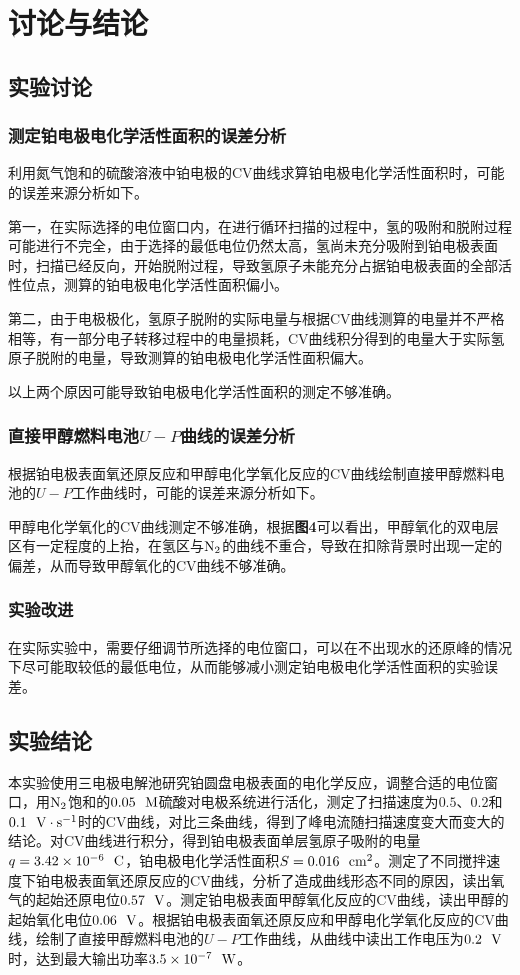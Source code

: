 \documentclass[12pt]{article}
\begin{document}
 	 \section{讨论与结论}
		\subsection{实验讨论}
 			\subsubsection{测定铂电极电化学活性面积的误差分析}
利用氮气饱和的硫酸溶液中铂电极的CV曲线求算铂电极电化学活性面积时，可能的误差来源分析如下。\par 
第一，在实际选择的电位窗口内，在进行循环扫描的过程中，氢的吸附和脱附过程可能进行不完全，由于选择的最低电位仍然太高，氢尚未充分吸附到铂电极表面时，扫描已经反向，开始脱附过程，导致氢原子未能充分占据铂电极表面的全部活性位点，测算的铂电极电化学活性面积偏小。\par 
第二，由于电极极化，氢原子脱附的实际电量与根据CV曲线测算的电量并不严格相等，有一部分电子转移过程中的电量损耗，CV曲线积分得到的电量大于实际氢原子脱附的电量，导致测算的铂电极电化学活性面积偏大。\par 
以上两个原因可能导致铂电极电化学活性面积的测定不够准确。
\subsubsection{直接甲醇燃料电池$U-P$曲线的误差分析}
根据铂电极表面氧还原反应和甲醇电化学氧化反应的CV曲线绘制直接甲醇燃料电池的$U-P$工作曲线时，可能的误差来源分析如下。\par 
甲醇电化学氧化的CV曲线测定不够准确，根据\textbf{图4}可以看出，甲醇氧化的双电层区有一定程度的上抬，在氢区与$\rm N_{2}$的曲线不重合，导致在扣除背景时出现一定的偏差，从而导致甲醇氧化的CV曲线不够准确。
 	 	\subsubsection{实验改进}
在实际实验中，需要仔细调节所选择的电位窗口，可以在不出现水的还原峰的情况下尽可能取较低的最低电位，从而能够减小测定铂电极电化学活性面积的实验误差。


 	 \subsection{实验结论}
本实验使用三电极电解池研究铂圆盘电极表面的电化学反应，调整合适的电位窗口，用${\rm N_{2}}$饱和的${\rm 0.05 \ \ M}$硫酸对电极系统进行活化，测定了扫描速度为$0.5$、$0.2$和$0.1\ \ {\rm V\cdot s^{-1}}$时的CV曲线，对比三条曲线，得到了峰电流随扫描速度变大而变大的结论。对CV曲线进行积分，得到铂电极表面单层氢原子吸附的电量$q=3.42\times 10^{-6}\ \ {\rm C}$，铂电极电化学活性面积$S=0.016\ \ {\rm cm^{2}}$。测定了不同搅拌速度下铂电极表面氧还原反应的CV曲线，分析了造成曲线形态不同的原因，读出氧气的起始还原电位$0.57\ \ {\rm V}$。测定铂电极表面甲醇氧化反应的CV曲线，读出甲醇的起始氧化电位$0.06\ \ {\rm V}$。根据铂电极表面氧还原反应和甲醇电化学氧化反应的CV曲线，绘制了直接甲醇燃料电池的$U-P$工作曲线，从曲线中读出工作电压为$0.2\ \ {\rm V}$时，达到最大输出功率$3.5\times 10^{-7}\ \ {\rm W}$。


 

   

\vbox{}



\end{document}
